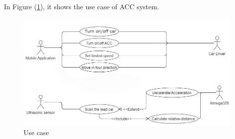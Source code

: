 \documentclass[12pt,a4paper]{report}
\begin{document}
\subsection{\fontsize{12}{12}\selectfont{ACC use case:}}
In Figure (\ref{fig:useCase}), it shows the use case of ACC system.
\begin{figure}[H]
    \centering
    \graphicspath{ {./images/} }
    \includegraphics[width=1\textwidth]{ACC use case .jpg}
    \caption{Use case}
    \label{fig:useCase}
\end{figure}
\end{document}
